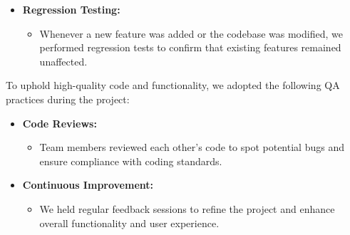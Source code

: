 \documentclass[a4paper,14pt]{article}
\begin{document}
{{{{{{{{{{{{{\begin{itemize}
				\item \textbf{Regression Testing:}
				\begin{itemize}
					\item Whenever a new feature was added or the codebase was modified, we performed regression tests to confirm that existing features remained unaffected.
				\end{itemize}
				
			\end{itemize}
		\vspace{0.5cm}    
		{
			\noindent \normalsize
			\justifying To uphold high-quality code and functionality, we adopted the following QA practices during the project:
			
			\begin{itemize}
				\item \textbf{Code Reviews:}
				\begin{itemize}
					\item Team members reviewed each other's code to spot potential bugs and ensure compliance with coding standards.
				\end{itemize}
				
				\item \textbf{Continuous Improvement:}
				\begin{itemize}
					\item We held regular feedback sessions to refine the project and enhance overall functionality and user experience.
				\end{itemize}
			\end{itemize}
			
		\vspace{0.5cm}
		}}}}}}}}}}}}}}
\end{document}
